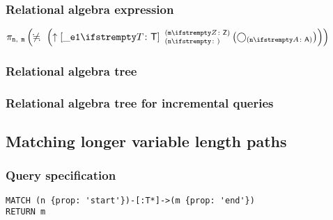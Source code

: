 \subsubsection*{Relational algebra expression}

$\projection{\var{n},~\var{m}} \left(\alldifferent{} \left(\expandout{\_e1}{T}{n}{m}{Z} \left(\getvertices{n}{A}\right)\right)\right)$

\subsubsection*{Relational algebra tree}


\subsubsection*{Relational algebra tree for incremental queries}


\subsection{Matching longer variable length paths}

\subsubsection*{Query specification}

\begin{lstlisting}
MATCH (n {prop: 'start'})-[:T*]->(m {prop: 'end'})
RETURN m
\end{lstlisting}

